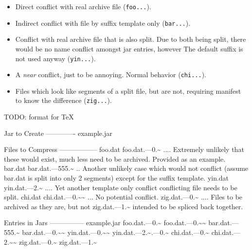 \documentclass[a4paper, 12pt, pdftex]{report}
\begin{document}
\begin{itemize}
  \item Direct conflict with real archive file
        (\texttt{foo...}).

  \item Indirect conflict with file by suffix template only
        (\texttt{bar...}).

  \item Conflict with real archive file that is also split. Due to
        both being split, there would be no name conflict amongst jar
        entries, however The default suffix is not used anyway
        (\texttt{yin...}).

  \item A \emph{near} conflict, just to be annoying. Normal behavior
        (\texttt{chi...}).

  \item Files which look like segments of a split file, but are not,
        requiring manifest to know the difference (\texttt{zig...}).
\end{itemize}

TODO: format for TeX

Jar to Create
-------------
    example.jar

Files to Compress
-----------------
    foo.dat
    foo.dat.---0.\~{} .... Extremely unlikely that these would exist,
                        much less need to be archived. Provided as an
                        example.
    bar.dat
    bar.dat.---555.\~{} .. Another unlikely case which would not conflict
                        (assume bar.dat is split into only 2 segments)
                        except for the suffix template.
    yin.dat
    yin.dat.---2.\~{} .... Yet another template only conflict
                        conflicting file needs to be split.
    chi.dat
    chi.dat.---0.\~{}\~{} ... No potential conflict.
    zig.dat.---0.\~{} .... Files to be archived as they are, but not
    zig.dat.---1.\~{}      intended to be spliced back together.

Entries in Jars
---------------
    example.jar           foo.dat.---0.\~{}
                          foo.dat.---0.\~{}\~{}
                          bar.dat.---555.\~{}
                          bar.dat.---0.\~{}\~{}
                          yin.dat.---0.\~{}\~{}
                          yin.dat.---2.\~{}.---0.\~{}
                          chi.dat.---0.\~{}
                          chi.dat.---2.\~{}\~{}
                          zig.dat.---0.\~{}
                          zig.dat.---1.\~{}
    
\end{document}
